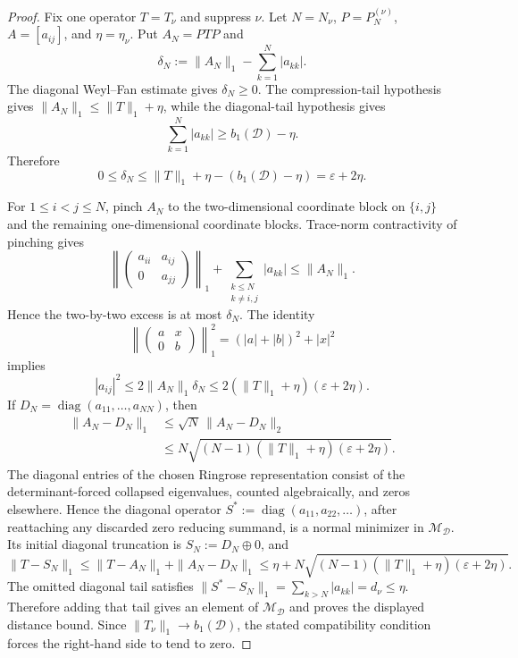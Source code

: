 \begin{proof}
  Fix one operator \(T=T_\nu\) and suppress \(\nu\).  Let \(N=N_\nu\),
  \(P=P_N^{(\nu)}\), \(A=[a_{ij}]\), and \(\eta=\eta_\nu\).  Put
  \(A_N=PTP\) and
  \[
    \delta_N:=\|A_N\|_1-\sum_{k=1}^N|a_{kk}| .
  \]
  The diagonal Weyl--Fan estimate gives \(\delta_N\ge0\).  The compression-tail
  hypothesis gives \(\|A_N\|_1\le\|T\|_1+
  \eta\), while the diagonal-tail hypothesis gives
  \[
    \sum_{k=1}^N|a_{kk}|
    \ge b_1(\mathcal D)-\eta .
  \]
  Therefore
  \[
    0\le\delta_N\le \|T\|_1+
      \eta-(b_1(\mathcal D)-\eta)
    =\varepsilon+2\eta .
  \]

  For \(1\le i<j\le N\), pinch \(A_N\) to the two-dimensional coordinate block
  on \(\{i,j\}\) and the remaining one-dimensional coordinate blocks.  Trace-norm
  contractivity of pinching gives
  \[
    \left\|
      \begin{pmatrix}a_{ii}&a_{ij}\\0&a_{jj}\end{pmatrix}
    \right\|_1
    +\sum_{\substack{k\le N\\k\ne i,j}}|a_{kk}|
    \le\|A_N\|_1 .
  \]
  Hence the two-by-two excess is at most \(\delta_N\).  The identity
  \[
    \left\|
      \begin{pmatrix}a&x\\0&b\end{pmatrix}
    \right\|_1^2=(|a|+|b|)^2+|x|^2
  \]
  implies
  \[
    |a_{ij}|^2
    \le 2\|A_N\|_1\delta_N
    \le 2(\|T\|_1+
      \eta)(\varepsilon+2\eta).
  \]
  If \(D_N=\operatorname{diag}(a_{11},\ldots,a_{NN})\), then
  \[
  \begin{aligned}
    \|A_N-D_N\|_1
    &\le \sqrt N\,\|A_N-D_N\|_2 \\
    &\le
    N\sqrt{(N-1)(\|T\|_1+
      \eta)(\varepsilon+2\eta)} .
  \end{aligned}
  \]
  The diagonal entries of the chosen Ringrose representation consist of the
  determinant-forced collapsed eigenvalues, counted algebraically, and zeros
  elsewhere. Hence the diagonal operator
  \(S^\ast:=\operatorname{diag}(a_{11},a_{22},\ldots)\), after reattaching any
  discarded zero reducing summand, is a normal minimizer in
  \(\mathcal M_{\mathcal D}\).  Its initial diagonal truncation is
  \(S_N:=D_N\oplus0\), and
  \[
    \|T-S_N\|_1
    \le \|T-A_N\|_1+
      \|A_N-D_N\|_1
    \le \eta+
      N\sqrt{(N-1)(\|T\|_1+
      \eta)(\varepsilon+2\eta)} .
  \]
  The omitted diagonal tail satisfies
  \(\|S^\ast-S_N\|_1=\sum_{k>N}|a_{kk}|=d_\nu\le\eta\).  Therefore adding that
  tail gives an element of \(\mathcal M_{\mathcal D}\) and proves the displayed
  distance bound.
  Since \(\|T_\nu\|_1\to b_1(\mathcal D)\), the stated compatibility condition
  forces the right-hand side to tend to zero.


\end{proof}
